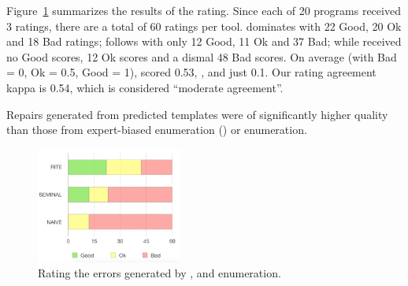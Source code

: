 %
Figure~\ref{fig:comparison} summarizes the results of the rating.
%
Since each of 20 programs received 3 ratings, there are a
total of 60 ratings per tool.
%
\toolname dominates with 22 Good, 20 Ok and 18 Bad ratings;
\seminal follows with only 12 Good, 11 Ok and 37 Bad; while
\naive received no Good scores, 12 Ok scores and a
dismal 48 Bad scores.
%
On average (with Bad = 0, Ok = 0.5, Good = 1),
\toolname scored 0.53, , and \naive
just 0.1.
%
Our rating agreement kappa is 0.54, which is considered ``moderate agreement''.

\begin{framed}
  \noindent Repairs generated from predicted
  templates were of significantly higher quality
  than those from expert-biased enumeration (\seminal)
  or \naive enumeration.
\end{framed}

\begin{figure}[t]
  \centering
  \includegraphics[height=1.5in]{comparison.png}
  \caption{Rating the errors generated by \toolname, \seminal and \naive enumeration.}
  \label{fig:comparison}
\end{figure}
